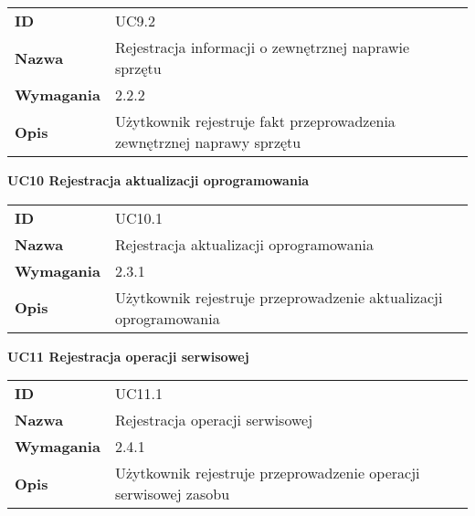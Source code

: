 \vspace{.05\textheight}

\begin{tabular}{p{}p{}}
\hfill {\bf ID} & UC9.2 \\
\hfill {\bf Nazwa} &  Rejestracja informacji o zewnętrznej naprawie sprzętu \\
\hfill {\bf Wymagania} &  2.2.2 \\
\hfill {\bf Opis} &  Użytkownik rejestruje fakt przeprowadzenia zewnętrznej naprawy sprzętu \\
\end{tabular}

\vspace{.03\textheight}
\begin{center}
  {\Large\bf UC10 Rejestracja aktualizacji oprogramowania} \\
\end{center}
\vspace{.02\textheight}

\begin{tabular}{p{}p{}}
\hfill {\bf ID} & UC10.1 \\
\hfill {\bf Nazwa} & Rejestracja aktualizacji oprogramowania \\
\hfill {\bf Wymagania} & 2.3.1 \\
\hfill {\bf Opis} & Użytkownik rejestruje przeprowadzenie aktualizacji oprogramowania \\
\end{tabular}

\vspace{.03\textheight}
\begin{center}
  {\Large\bf UC11 Rejestracja operacji serwisowej} \\
\end{center}
\vspace{.02\textheight}

\begin{tabular}{p{}p{}}
\hfill {\bf ID} & UC11.1 \\
\hfill {\bf Nazwa} &  Rejestracja operacji serwisowej \\
\hfill {\bf Wymagania} &  2.4.1 \\
\hfill {\bf Opis} & Użytkownik rejestruje przeprowadzenie operacji serwisowej zasobu  \\
\end{tabular}

